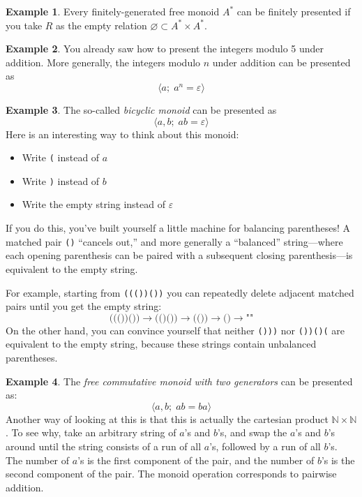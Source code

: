 \documentclass[headsepline,bibliography=totoc]{scrreport}
\theoremstyle{definition}
\newtheorem{example}{Example}[chapter]
\theoremstyle{definition}
\theoremstyle{definition}
\begin{document}
\begin{example}
Every finitely-generated free monoid $A^*$ can be finitely presented if you take $R$ as the empty relation $\varnothing\subset A^*\times A^*$.
\end{example}

\begin{example}
You already saw how to present the integers modulo 5 under addition. More generally, the integers modulo $n$ under addition can be presented as
\[\langle a;\; a^n=\varepsilon \rangle\]
\end{example}

\begin{example}\label{bicyclic}
The so-called \emph{bicyclic monoid} can be presented as
\[\langle a, b;\; ab=\varepsilon\rangle\]
Here is an interesting way to think about this monoid:
\begin{itemize}
\item Write \texttt{(} instead of $a$
\item Write \texttt{)} instead of $b$
\item Write the empty string instead of $\varepsilon$
\end{itemize}
If you do this, you've built yourself a little machine for balancing parentheses! A matched pair \texttt{()} ``cancels out,'' and more generally a ``balanced'' string---where each opening parenthesis can be paired with a subsequent closing parenthesis---is equivalent to the empty string.

For example, starting from \texttt{((())())} you can repeatedly delete adjacent matched pairs until you get the empty string:
\[\texttt{((())())}\rightarrow\texttt{(()())}\rightarrow\texttt{(())}\rightarrow\texttt{()}\rightarrow\texttt{""}\]
On the other hand, you can convince yourself that neither \texttt{()))} nor \texttt{())()(} are equivalent to the empty string, because these strings contain unbalanced parentheses.
\end{example}

\begin{example}
The \emph{free commutative monoid with two generators} can be presented as:
\[\langle a, b;\; ab=ba\rangle\]
Another way of looking at this is that this is actually the cartesian product $\mathbb{N}\times\mathbb{N}$. To see why, take an arbitrary string of $a$'s and $b$'s, and swap the $a$'s and $b$'s around until the string consists of a run of all $a$'s, followed by a run of all $b$'s. The number of $a$'s is the first component of the pair, and the number of $b$'s is the second component of the pair. The monoid operation corresponds to pairwise addition.
\end{example}
\end{document}
